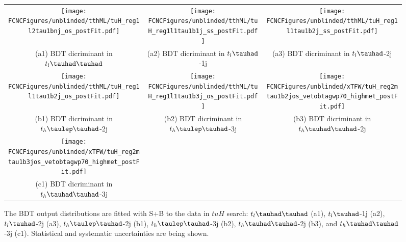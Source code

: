 \begin{figure}[H]
\begin{tabular}{@{}ccc@{}}
\texttt{[image: \\FCNCFigures/unblinded/tthML/tuH\_reg1l2tau1bnj\_os\_postFit.pdf]}&
\texttt{[image: \\FCNCFigures/unblinded/tthML/tuH\_reg1l1tau1b1j\_ss\_postFit.pdf]}&
\texttt{[image: \\FCNCFigures/unblinded/tthML/tuH\_reg1l1tau1b2j\_ss\_postFit.pdf]}\\
(a1) BDT dicriminant in $t_l\thadhad$ & (a2) BDT dicriminant in  $t_l\tauhad$-1j& (a3) BDT dicriminant in $t_l\tauhad$-2j\\
\texttt{[image: \\FCNCFigures/unblinded/tthML/tuH\_reg1l1tau1b2j\_os\_postFit.pdf]}&
\texttt{[image: \\FCNCFigures/unblinded/tthML/tuH\_reg1l1tau1b3j\_os\_postFit.pdf]}&
\texttt{[image: \\FCNCFigures/unblinded/xTFW/tuH\_reg2mtau1b2jos\_vetobtagwp70\_highmet\_postFit.pdf]}\\
(b1) BDT dicriminant in $t_h\tlhad$-2j & (b2) BDT dicriminant in  $t_h\tlhad$-3j & (b3) BDT dicriminant in $t_h\thadhad$-2j \\
\texttt{[image: \\FCNCFigures/unblinded/xTFW/tuH\_reg2mtau1b3jos\_vetobtagwp70\_highmet\_postFit.pdf]}&\\
(c1) BDT dicriminant in$t_h\thadhad$-3j\\
\end{tabular}
\caption{ The BDT output distributions are fitted with S+B to the data in $tuH$ search: $t_l\thadhad$ (a1),  $t_l\tauhad$-1j (a2),  $t_l\tauhad$-2j (a3),
  $t_h\tlhad$-2j (b1), $t_h\tlhad$-3j (b2), $t_h\thadhad$-2j (b3), and $t_h\thadhad$-3j (c1). Statistical and systematic uncertainties are being shown.}
\label{fig:asimov_postfitbdtHu}
\end{figure}

